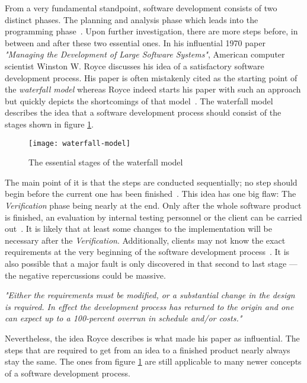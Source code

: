 \documentclass[12pt,a4paper,twoside]{report}
\begin{document}
From a very fundamental standpoint, software development consists of two distinct phases.
The planning and analysis phase which leads into the programming phase~\cite{royce-large-systems}.
Upon further investigation, there are more steps before, in between and after these two essential ones.
In his influential 1970 paper \textit{"Managing the Development of Large Software Systems"},
American computer scientist Winston W. Royce discusses his idea of a satisfactory
software development process. His paper is often mistakenly cited as the starting point
of the \textit{waterfall model} whereas Royce indeed starts his paper with such an approach but quickly
depicts the shortcomings of that model~\cite{royce-large-systems, larman-iid-history}.
The waterfall model describes the idea that a software development process should consist of
the stages shown in figure \ref{fig:waterfall-model}.
\begin{figure}[htbp]
\centering
\texttt{[image: waterfall-model]}
\caption{The essential stages of the waterfall model}
\label{fig:waterfall-model}
\end{figure}
The main point of it is that the steps are conducted sequentially;
no step should begin before the current one has been finished~\cite{boehm-spiral}.
This idea has one big flaw: The \textit{Verification} phase being nearly at the end.
Only after the whole software product is finished, an evaluation by
internal testing personnel or the client can be carried out~\cite{royce-large-systems}.
It is likely that at least some changes to the implementation will be necessary after the \textit{Verification}.
Additionally, clients may not know the exact requirements at the very beginning
of the software development process~\cite{parnas-rational-design-process}.
It is also possible that a major fault is only discovered in that second to last stage ---
the negative repercussions could be massive.
\begin{displayquote}
\emph{"Either the requirements must be modified, or a substantial change
in the design is required. In effect the development process has returned to
the origin and one can expect up to a 100-percent overrun
in schedule and/or costs."}~\cite{royce-large-systems}
\end{displayquote}
Nevertheless, the idea Royce describes is what made his paper as influential.
The steps that are required to get from an idea to a finished product nearly always
stay the same. The ones from figure \ref{fig:waterfall-model} are still applicable to
many newer concepts of a software development process.
\end{document}
